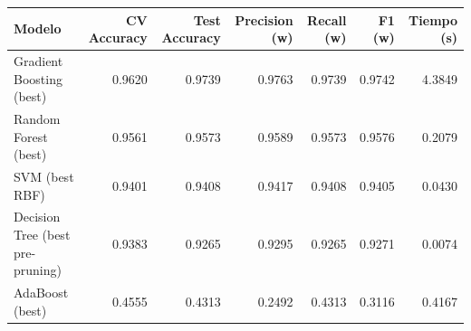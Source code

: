 \begin{tabular}{lrrrrrr}
\toprule
Modelo & CV Accuracy & Test Accuracy & Precision (w) & Recall (w) & F1 (w) & Tiempo (s) \\
\midrule
Gradient Boosting (best) & 0.9620 & 0.9739 & 0.9763 & 0.9739 & 0.9742 & 4.3849 \\
Random Forest (best) & 0.9561 & 0.9573 & 0.9589 & 0.9573 & 0.9576 & 0.2079 \\
SVM (best RBF) & 0.9401 & 0.9408 & 0.9417 & 0.9408 & 0.9405 & 0.0430 \\
Decision Tree (best pre-pruning) & 0.9383 & 0.9265 & 0.9295 & 0.9265 & 0.9271 & 0.0074 \\
AdaBoost (best) & 0.4555 & 0.4313 & 0.2492 & 0.4313 & 0.3116 & 0.4167 \\
\bottomrule
\end{tabular}
